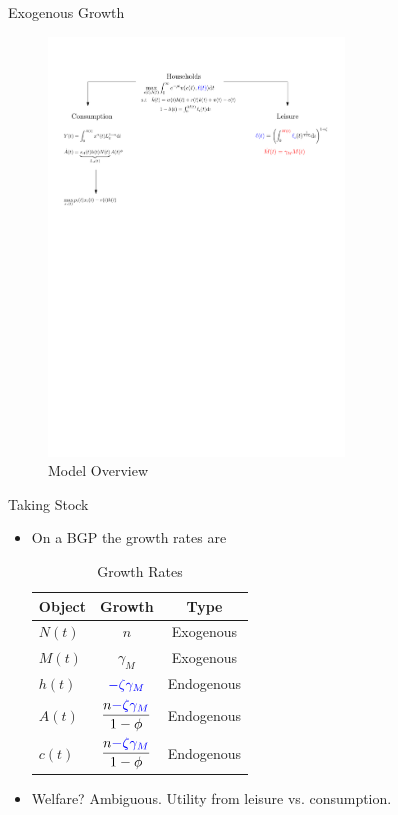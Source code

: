 \documentclass[usenames,dvipsnames,aspectratio=169]{beamer}
\begin{document}
\begin{frame}{Exogenous Growth}
    \begin{figure}
        \centering
        \includegraphics[width = 0.7\textwidth]{Presentation01/Figures/Mod1.pdf}
        \caption{Model Overview}
    \end{figure}
\end{frame}

\begin{frame}{Taking Stock}
\begin{itemize}
    \item On a BGP the growth rates are \\ \vspace{0.5cm}
    \begin{table}[htb]
        \centering
        \begin{tabular}{lcc} \hline
             Object & Growth & Type \\
             \hline\hline
             $N(t)$ & $n$ & Exogenous \\ 
             $M(t)$ & $\gamma_M$ & Exogenous \\ 
             $h(t)$ & $\textcolor{blue}{-\zeta \gamma_M}$ & Endogenous \\ 
             $A(t)$ & $\dfrac{n\textcolor{blue}{-\zeta\gamma_M}}{1-\phi}$ & Endogenous \\ 
             $c(t)$ &  $\dfrac{n\textcolor{blue}{-\zeta\gamma_M}}{1-\phi}$ & Endogenous \\ 
             \hline\hline
        \end{tabular}
        \caption{Growth Rates}
    \end{table}
    \item Welfare? Ambiguous. Utility from leisure vs. consumption. 
    \end{itemize}
\end{frame}
\end{document}
